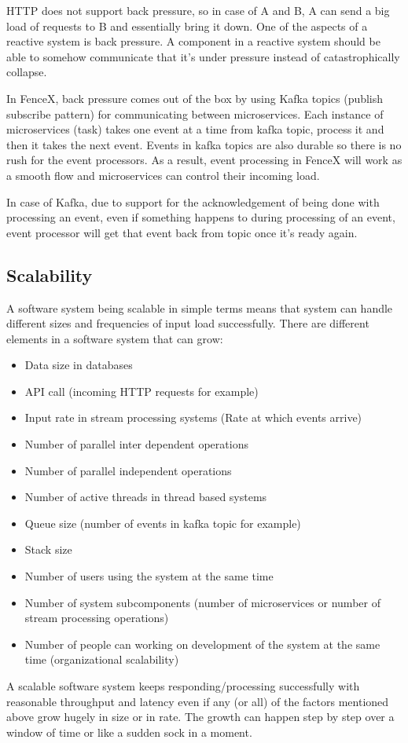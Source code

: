 \documentclass[a4]{report}
\begin{document}
    HTTP does not support back pressure, so in case of A and B, A can send a big load of requests to B and
    essentially bring it down.
    One of the aspects of a reactive system is back pressure.
    A component in a reactive system should be able to somehow communicate that it's under pressure instead of
    catastrophically collapse.

    In FenceX, back pressure comes out of the box by using Kafka topics (publish subscribe pattern) for communicating
    between microservices.
    Each instance of microservices (task) takes one event at a time from kafka topic, process it and then it takes
    the next event.
    Events in kafka topics are also durable so there is no rush for the event processors.
    As a result, event processing in FenceX will work as a smooth flow and microservices can control their incoming load.

    In case of Kafka, due to support for the acknowledgement of being done with processing an event, even if
    something happens to during processing of an event, event processor will get that event back from topic once it's
    ready again.

    \subsection{Scalability}
    A software system being scalable in simple terms means that system can handle different sizes and frequencies of
    input load successfully.
    There are different elements in a software system that can grow:
    \begin{itemize}
        \item Data size in databases
        \item API call (incoming HTTP requests for example)
        \item Input rate in stream processing systems (Rate at which events arrive)
        \item Number of parallel inter dependent operations
        \item Number of parallel independent operations
        \item Number of active threads in thread based systems
        \item Queue size (number of events in kafka topic for example)
        \item Stack size
        \item Number of users using the system at the same time
        \item Number of system subcomponents (number of microservices or number of stream processing operations)
        \item Number of people can working on development of the system at the same time (organizational scalability)
    \end{itemize}
    A scalable software system keeps responding/processing successfully with reasonable throughput and latency even if
    any (or all) of the factors mentioned above grow hugely in size or in rate.
    The growth can happen step by step over a window of time or like a sudden sock in a moment.
\end{document}
